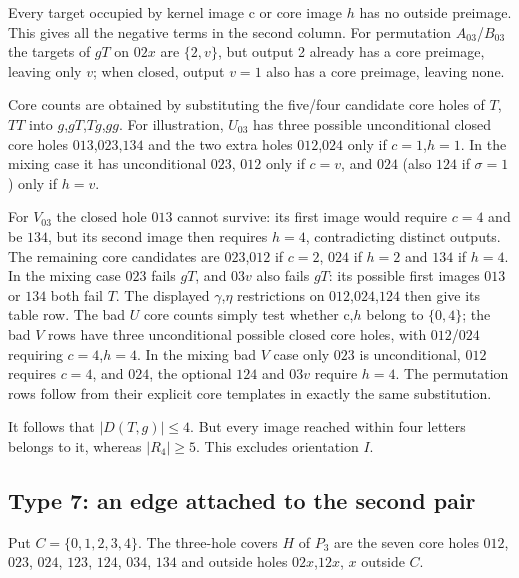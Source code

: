 \documentclass[11pt]{article}
\theoremstyle{definition}
\theoremstyle{plain}
\begin{document}
Every target occupied by kernel image c or core image \(h\) has no
outside preimage. This gives all the negative terms in the second
column. For permutation \(A_{03}\)/\(B_{03}\) the targets of \(gT\) on
\(02x\) are \(\{2,v\}\), but output 2 already has a core preimage,
leaving only \(v\); when closed, output \(v=1\) also has a core
preimage, leaving none.

Core counts are obtained by substituting the five/four candidate core
holes of \(T\),\(TT\) into \(g\),\(gT\),\(Tg\),\(gg\). For illustration, \(U_{03}\) has
three possible unconditional closed core holes \(013\),\(023\),\(134\) and the two
extra holes \(012\),\(024\) only if \(c=1\),\(h=1\). In the mixing case it has
unconditional \(023\), \(012\) only if \(c=v\), and \(024\) (also \(124\) if
\(\sigma=1\)) only if \(h=v\).

For \(V_{03}\) the closed hole \(013\) cannot survive: its first image would
require \(c=4\) and be \(134\), but its second image then requires \(h=4\),
contradicting distinct outputs. The remaining core candidates are
\(023\),\(012\) if \(c=2\), \(024\) if \(h=2\) and \(134\) if \(h=4\). In the mixing
case \(023\) fails \(gT\), and \(03v\) also fails \(gT\): its possible first images
\(013\) or \(134\) both fail \(T\). The displayed \(\gamma\),\(\eta\) restrictions on
\(012\),\(024\),\(124\) then give its table row. The bad \(U\) core counts simply
test whether c,\(h\) belong to \(\{0,4\}\); the bad \(V\) rows have three
unconditional possible closed core holes, with \(012\)/\(024\) requiring
\(c=4\),\(h=4\). In the mixing bad \(V\) case only \(023\) is unconditional,
\(012\) requires \(c=4\), and \(024\), the optional \(124\) and \(03v\) require
\(h=4\). The permutation rows follow from their explicit core templates
in exactly the same substitution.

It follows that \(|D(T,g)|\le4\). But every image
reached within four letters belongs to it, whereas \(|R_{4}|\ge 5\).
This excludes orientation \(I\).

\subsection{Type 7: an edge attached to the second pair}\label{second-pair-tail-early-type-7-exclusion-at-codimension-three}

Put \(C=\{0,1,2,3,4\}\). The three-hole covers \(H\) of \(P_{3}\) are the
seven core holes \(012\), \(023\), \(024\), \(123\), \(124\), \(034\), \(134\) and outside holes
\(02x\),\(12x\), \(x\) outside \(C\).
\end{document}
